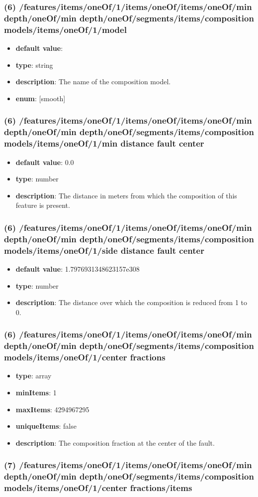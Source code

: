 \subsubsection{(6) /features/items/oneOf/1/items/oneOf/items/oneOf/min depth/oneOf/min depth/oneOf/segments/items/composition models/items/oneOf/1/model}
\begin{itemize}[leftmargin=6em]\item {\bf default value}: 
\item {\bf type}: string
\item {\bf description}: The name of the composition model.
\item {\bf enum}: [smooth]\end{itemize}\subsubsection{(6) /features/items/oneOf/1/items/oneOf/items/oneOf/min depth/oneOf/min depth/oneOf/segments/items/composition models/items/oneOf/1/min distance fault center}
\begin{itemize}[leftmargin=6em]\item {\bf default value}: 0.0
\item {\bf type}: number
\item {\bf description}: The distance in meters from which the composition of this feature is present.
\end{itemize}\subsubsection{(6) /features/items/oneOf/1/items/oneOf/items/oneOf/min depth/oneOf/min depth/oneOf/segments/items/composition models/items/oneOf/1/side distance fault center}
\begin{itemize}[leftmargin=6em]\item {\bf default value}: 1.7976931348623157e308
\item {\bf type}: number
\item {\bf description}: The distance over which the composition is reduced from 1 to 0.
\end{itemize}\subsubsection{(6) /features/items/oneOf/1/items/oneOf/items/oneOf/min depth/oneOf/min depth/oneOf/segments/items/composition models/items/oneOf/1/center fractions}
\begin{itemize}[leftmargin=6em]\item {\bf type}: array
\item {\bf minItems}: 1
\item {\bf maxItems}: 4294967295
\item {\bf uniqueItems}: false
\item {\bf description}: The composition fraction at the center of the fault.
\end{itemize}\subsubsection{(7) /features/items/oneOf/1/items/oneOf/items/oneOf/min depth/oneOf/min depth/oneOf/segments/items/composition models/items/oneOf/1/center fractions/items}
